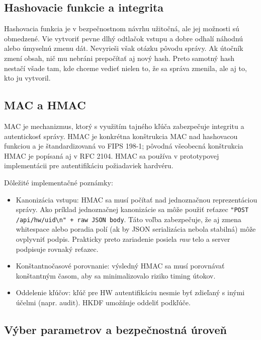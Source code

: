 \documentclass[journal,a4paper,onecolumn]{IEEEtran}
\begin{document}
\subsection{Hashovacie funkcie a integrita}

Hashovacia funkcia je v bezpečnostnom návrhu užitočná, ale jej možnosti sú obmedzené. Vie vytvoriť pevne dlhý odtlačok vstupu a dobre odhalí náhodnú alebo úmyselnú zmenu dát. Nevyrieši však otázku pôvodu správy. Ak útočník zmení obsah, nič mu nebráni prepočítať aj nový hash. Preto samotný hash nestačí všade tam, kde chceme vedieť nielen to, že sa správa zmenila, ale aj to, kto ju vytvoril.

\subsection{MAC a HMAC}

MAC je mechanizmus, ktorý s využitím tajného kľúča zabezpečuje integritu a autentickosť správy. HMAC je konkrétna konštrukcia MAC nad hashovacou funkciou a je štandardizovaná vo FIPS 198-1; pôvodná všeobecná konštrukcia HMAC je popísaná aj v RFC 2104.\cite{FIPS1981,RFC2104} HMAC sa používa v prototypovej implementácii pre autentifikáciu požiadaviek hardvéru.

Dôležité implementačné poznámky:

\begin{itemize}[leftmargin=*,itemsep=2pt]
  \item Kanonizácia vstupu: HMAC sa musí počítať nad jednoznačnou reprezentáciou správy. Ako príklad jednoznačnej kanonizácie sa môže použiť reťazec \texttt{"POST /api/hw/uid\textbackslash n" + raw JSON body}. Táto voľba zabezpečuje, že aj zmena whitespace alebo poradia polí (ak by JSON serializácia nebola stabilná) môže ovplyvniť podpis. Prakticky preto zariadenie posiela \emph{raw} telo a server podpisuje rovnaký reťazec.
  \item Konštantnočasové porovnanie: výsledný HMAC sa musí porovnávať konštantným časom, aby sa minimalizovalo riziko timing útokov.
  \item Oddelenie kľúčov: kľúč pre HW autentifikáciu nesmie byť zdieľaný s inými účelmi (napr. audit). HKDF umožňuje oddeliť podkľúče\cite{RFC5869}.
\end{itemize}


\subsection{Výber parametrov a bezpečnostná úroveň}
\end{document}
